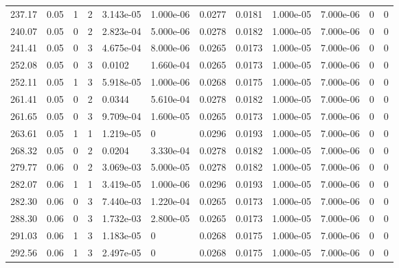 \documentclass[preview]{standalone}
\begin{document}
{{{\begin{tabular}{L{1.2cm}C{1.2cm} C{0.3cm}C{0.5cm} C{1.4cm}C{1.4cm} C{1.4cm}C{1.4cm} C{1.6cm}C{1.6cm} C{1.6cm}C{1.6cm}}
  237.17  &  0.05  & 1     &  2 &  3.143e-05  & 1.000e-06  &  0.0277&   0.0181& 1.000e-05 & 7.000e-06   &  0 & 0  \\ 
  240.07  &  0.05  & 0     &  2 &  2.823e-04  & 5.000e-06  &  0.0278&   0.0182& 1.000e-05 & 7.000e-06   &  0 & 0  \\ 
  241.41  &  0.05  & 0     &  3 &  4.675e-04  & 8.000e-06  &  0.0265&   0.0173& 1.000e-05 & 7.000e-06   &  0 & 0  \\ 
  252.08  &  0.05  & 0     &  3 &  0.0102  & 1.660e-04  &  0.0265&   0.0173& 1.000e-05 & 7.000e-06   &  0 & 0  \\ 
  252.11  &  0.05  & 1     &  3 &  5.918e-05  & 1.000e-06  &  0.0268&   0.0175& 1.000e-05 & 7.000e-06   &  0 & 0  \\ 
  261.41  &  0.05  & 0     &  2 &  0.0344  & 5.610e-04  &  0.0278&   0.0182& 1.000e-05 & 7.000e-06   &  0 & 0  \\ 
  261.65  &  0.05  & 0     &  3 &  9.709e-04  & 1.600e-05  &  0.0265&   0.0173& 1.000e-05 & 7.000e-06   &  0 & 0  \\ 
  263.61  &  0.05  & 1     &  1 &  1.219e-05  & 0  &  0.0296&   0.0193& 1.000e-05 & 7.000e-06   &  0 & 0  \\ 
  268.32  &  0.05  & 0     &  2 &  0.0204  & 3.330e-04  &  0.0278&   0.0182& 1.000e-05 & 7.000e-06   &  0 & 0  \\ 
  279.77  &  0.06  & 0     &  2 &  3.069e-03  & 5.000e-05  &  0.0278&   0.0182& 1.000e-05 & 7.000e-06   &  0 & 0  \\ 
  282.07  &  0.06  & 1     &  1 &  3.419e-05  & 1.000e-06  &  0.0296&   0.0193& 1.000e-05 & 7.000e-06   &  0 & 0  \\ 
  282.30  &  0.06  & 0     &  3 &  7.440e-03  & 1.220e-04  &  0.0265&   0.0173& 1.000e-05 & 7.000e-06   &  0 & 0  \\ 
  288.30  &  0.06  & 0     &  3 &  1.732e-03  & 2.800e-05  &  0.0265&   0.0173& 1.000e-05 & 7.000e-06   &  0 & 0  \\ 
  291.03  &  0.06  & 1     &  3 &  1.183e-05  & 0  &  0.0268&   0.0175& 1.000e-05 & 7.000e-06   &  0 & 0  \\ 
  292.56  &  0.06  & 1     &  3 &  2.497e-05  & 0  &  0.0268&   0.0175& 1.000e-05 & 7.000e-06   &  0 & 0  \\ 
\hline 
\end{tabular} 

}}}
\end{document}
